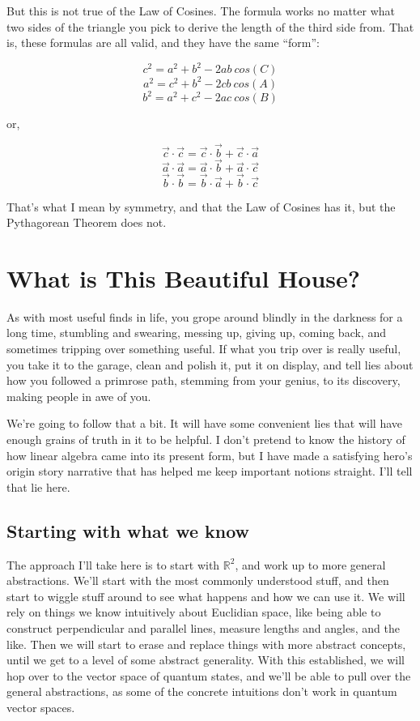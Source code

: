 \documentclass[
]{book}
\begin{document}
But this is not true of the Law of Cosines. The formula works no matter what two sides of the triangle you pick to derive the length of the third side from. That is, these formulas are all valid, and they have the same ``form'':

\[c^2 = a^2 + b^2 - 2 a b \ cos(C)\]
\[a^2 = c^2 + b^2 - 2 c b \ cos(A)\]
\[b^2 = a^2 + c^2 - 2 a c \ cos(B)\]

or,

\[\vec{c}\cdot\vec{c} = \vec{c}\cdot\vec{b} + \vec{c}\cdot\vec{a}\]
\[\vec{a}\cdot\vec{a} = \vec{a}\cdot\vec{b} + \vec{a}\cdot\vec{c}\]
\[\vec{b}\cdot\vec{b} = \vec{b}\cdot\vec{a} + \vec{b}\cdot\vec{c}\]

That's what I mean by symmetry, and that the Law of Cosines has it, but the Pythagorean Theorem does not.

\hypertarget{what-is-this-beautiful-house}{%
\chapter{What is This Beautiful House?}\label{what-is-this-beautiful-house}}

As with most useful finds in life, you grope around blindly in the darkness for a long time, stumbling and swearing, messing up, giving up, coming back, and sometimes tripping over something useful. If what you trip over is really useful, you take it to the garage, clean and polish it, put it on display, and tell lies about how you followed a primrose path, stemming from your genius, to its discovery, making people in awe of you.

We're going to follow that a bit. It will have some convenient lies that will have enough grains of truth in it to be helpful. I don't pretend to know the history of how linear algebra came into its present form, but I have made a satisfying hero's origin story narrative that has helped me keep important notions straight. I'll tell that lie here.

\hypertarget{starting-with-what-we-know}{%
\section{Starting with what we know}\label{starting-with-what-we-know}}

The approach I'll take here is to start with \(\mathbb{R}^2\), and work up to more general abstractions. We'll start with the most commonly understood stuff, and then start to wiggle stuff around to see what happens and how we can use it. We will rely on things we know intuitively about Euclidian space, like being able to construct perpendicular and parallel lines, measure lengths and angles, and the like. Then we will start to erase and replace things with more abstract concepts, until we get to a level of some abstract generality. With this established, we will hop over to the vector space of quantum states, and we'll be able to pull over the general abstractions, as some of the concrete intuitions don't work in quantum vector spaces.
\end{document}
